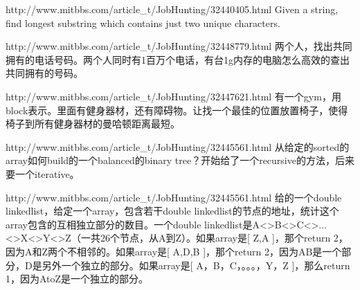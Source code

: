 \documentclass[a4paper]{article}
\begin{document}
\begin{CJK}{UTF8}{gbsn}
\begin{enumerate}
\begin{Q}[Google]{http://www.mitbbs.com/article_t/JobHunting/32440405.html}
Given a string, find longest substring which contains just two unique characters.
\end{Q}

\begin{Q}[Amazon]{http://www.mitbbs.com/article_t/JobHunting/32448779.html}
两个人，找出共同拥有的电话号码。两个人同时有1百万个电话，有台1g内存的电脑怎么高效的查出共同拥有的号码。
\end{Q}

\begin{Q}[Google]{http://www.mitbbs.com/article_t/JobHunting/32447621.html}
有一个gym，用block表示。里面有健身器材，还有障碍物。让找一个最佳的位置放置椅子，使得椅子到所有健身器材的曼哈顿距离最短。
\end{Q}

\begin{Q}[Google]{http://www.mitbbs.com/article_t/JobHunting/32445561.html}
从给定的sorted的array如何build的一个balanced的binary tree？开始给了一个recursive的方法，后来要一个iterative。
\end{Q}

\begin{Q}[Google]{http://www.mitbbs.com/article_t/JobHunting/32445561.html}
给的一个double linkedlist，给定一个array，包含若干double linkedlist的节点的地址，统计这个array包含的互相独立部分的数目。一个double linkedlist是A<>B<>C<>...<>X<>Y<>Z（一共26个节点，从A到Z）。如果array是[ Z,A ]，那个return 2，因为A和Z两个不相邻的。如果array是[ A,D,B ]，那个return 2，因为AB是一个部分，D是另外一个独立的部分。如果array是[ A，B，C，。。。，Y，Z ]，那么return 1，因为AtoZ是一个独立的部分。
\end{Q}

\end{enumerate}
\end{CJK}
\end{document}
